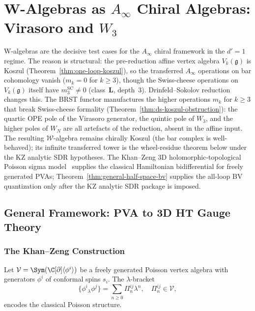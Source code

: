 \section{W-Algebras as $A_\infty$ Chiral Algebras: Virasoro and $W_3$}

W-algebras are the decisive test cases for the $A_\infty$ chiral framework in the $d' = 1$ regime. The reason is structural: the pre-reduction affine vertex algebra $V_k(\mathfrak{g})$ is Koszul (Theorem~\ref{thm:one-loop-koszul}), so the transferred $A_\infty$ operations on bar cohomology vanish ($m_k = 0$ for $k \ge 3$), though the Swiss-cheese operations on $V_k(\mathfrak{g})$ itself have $m_3^{\mathrm{SC}} \neq 0$ (class~$\mathbf{L}$, depth~$3$). Drinfeld--Sokolov reduction changes this. The BRST functor manufactures the higher operations $m_k$ for $k \ge 3$ that break Swiss-cheese formality (Theorem~\ref{thm:ds-koszul-obstruction}): the quartic OPE pole of the Virasoro generator, the quintic pole of $W_3$, and the higher poles of $W_N$ are all artefacts of the reduction, absent in the affine input. The resulting $\mathcal{W}$-algebra remains chirally Koszul (the bar complex is well-behaved); its infinite transferred tower is the wheel-residue theorem below under the KZ analytic SDR hypotheses. The Khan--Zeng 3D holomorphic-topological Poisson sigma model~\cite{KZ25} supplies the classical Hamiltonian bidifferential for freely generated PVAs; Theorem~\ref{thm:general-half-space-bv} supplies the all-loop BV quantization only after the KZ analytic SDR package is imposed.

\subsection{General Framework: PVA to 3D HT Gauge Theory}

\subsubsection{The Khan--Zeng Construction}

Let $\mathcal{V} = \Sym(\C[\partial]\langle \phi^i \rangle)$ be a freely generated Poisson vertex algebra with generators $\phi^i$ of conformal spins $s_i$. The $\lambda$-bracket
\[
\{\phi^i{}_\lambda \phi^j\} = \sum_{n \geq 0} \Pi^{ij}_n \lambda^n, \quad \Pi^{ij}_n \in \mathcal{V},
\]
encodes the classical Poisson structure.

